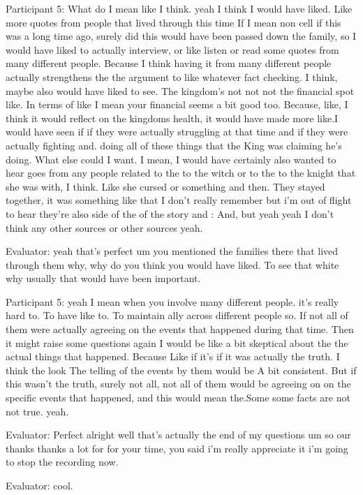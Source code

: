\documentclass{l4proj}
\begin{document}
\begin{appendices}
Participant 5: What do I mean like I think. yeah I think I would have liked. Like more quotes from people that lived through this time If I mean non cell if this was a long time ago, surely did this would have been passed down the family, so I would have liked to actually interview, or like listen or read some quotes from many different people. Because I think having it from many different people actually strengthens the the argument to like whatever fact checking. I think, maybe also would have liked to see. The kingdom's not not not the financial spot like. In terms of like I mean your financial seems a bit good too. Because, like, I think it would reflect on the kingdoms health, it would have made more like.I would have seen if if they were actually struggling at that time and if they were actually fighting and. doing all of these things that the King was claiming he's doing. What else could I want. I mean, I would have certainly also wanted to hear goes from any people related to the to the witch or to the to the knight that she was with, I think. Like she cursed or something and then. They stayed together, it was something like that I don't really remember but i'm out of flight to hear they're also side of the of the story and : And, but yeah yeah I don't think any other sources or other sources yeah.

Evaluator: yeah that's perfect um you mentioned the families there that lived through them why, why do you think you would have liked. To see that white why usually that would have been important.

Participant 5: yeah I mean when you involve many different people. it's really hard to. To have like to. To maintain ally across different people so. If not all of them were actually agreeing on the events that happened during that time. Then it might raise some questions again I would be like a bit skeptical about the the actual things that happened. Because Like if it's if it was actually the truth. I think the look The telling of the events by them would be A bit consistent.  But if this wasn't the truth, surely not all, not all of them would be agreeing on on the specific events that happened, and this would mean the.Some some facts are not not true. yeah.

Evaluator: Perfect alright well that's actually the end of my questions um so our thanks thanks a lot for for your time, you said i'm really appreciate it i'm going to stop the recording now.


Evaluator: cool.


\end{appendices}
\end{document}
